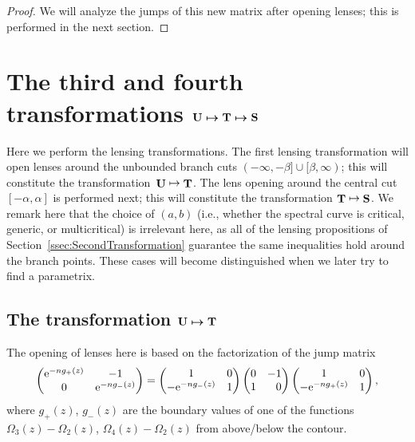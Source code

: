 \documentclass[10pt,a4paper]{amsart}
\DeclareMathOperator{\TT}{{\bf T}}
\DeclareMathOperator{\UU}{{\bf U}}
\DeclareMathOperator{\boldS}{{\bf S}}
\numberwithin{equation}{section}
\begin{document}
\begin{proof}
 We will analyze the jumps of this new matrix after opening lenses; this is performed in the next section.
\end{proof}

\section[The third and fourth transformations ${\bf U} \mapsto {\bf T} \mapsto {\bf S}$]{The third and fourth transformations $\boldsymbol{{\bf U} \mapsto {\bf T} \mapsto {\bf S}}$}\label{section5}
Here we perform the lensing transformations. The first lensing transformation will open lenses around the unbounded branch cuts
$(-\infty,-\beta] \cup [\beta,\infty)$; this will constitute the transformation~${\UU \mapsto \TT}$. The lens opening around the central cut
$[-\alpha,\alpha]$ is performed next; this will constitute the transformation $\TT\mapsto\boldS$. We remark here that the choice of $(a,b)$
(i.e., whether the spectral curve is critical, generic, or multicritical) is irrelevant here, as all of the lensing propositions of Section~\ref{ssec:SecondTransformation} guarantee
the same inequalities hold around the branch points. These cases will become distinguished when we later try to find a parametrix.

\subsection[The transformation ${\bf U} \mapsto {\bf T}$]{The transformation $\boldsymbol{{\bf U} \mapsto {\bf T}}$}
The opening of lenses here is based on the factorization of the jump matrix
 \begin{equation*}
 \begin{pmatrix}
 {\rm e}^{-ng_+(z)} & -1 \\
 0 & {\rm e}^{-n g_-(z)}
 \end{pmatrix}
 =
 \begin{pmatrix}
 1 & 0 \\
 -{\rm e}^{-n g_-(z)} & 1
 \end{pmatrix}
 \begin{pmatrix}
 0 & -1 \\
 1 & \hphantom{-} 0
 \end{pmatrix}
 \begin{pmatrix}
 1 & 0 \\
 -{\rm e}^{-n g_+(z)} & 1
 \end{pmatrix},
 \end{equation*}
where $g_+(z)$, $g_-(z)$ are the boundary values of one of the functions $\Omega_3(z) -\Omega_2(z)$, $\Omega_4(z) - \Omega_2(z)$ from above/below the contour.
\end{document}
